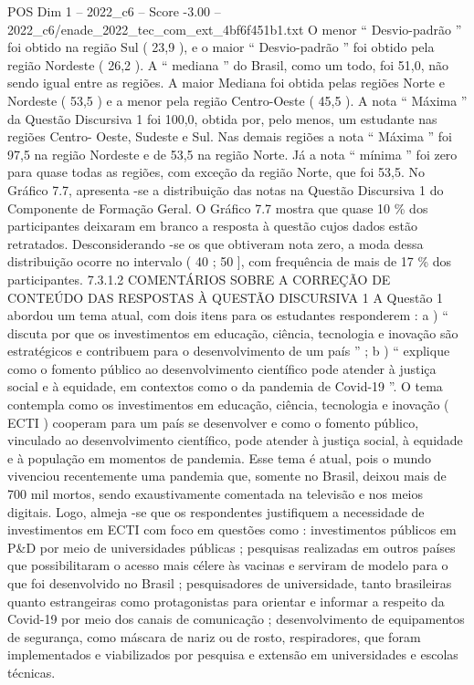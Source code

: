 \begin{textsample}{POS Dim 1 – 2022\_c6 – Score -3.00 – 2022\_c6/enade\_2022\_tec\_com\_ext\_4bf6f451b1.txt}
O menor “ Desvio-padrão ” foi obtido na região Sul ( 23,9 ), e o maior “ Desvio-padrão ” foi obtido pela região Nordeste ( 26,2 ).
A “ mediana ” do Brasil, como um todo, foi 51,0, não sendo igual entre as regiões.
A maior Mediana foi obtida pelas regiões Norte e Nordeste ( 53,5 ) e a menor pela região Centro-Oeste ( 45,5 ).
A nota “ Máxima ” da Questão Discursiva 1 foi 100,0, obtida por, pelo menos, um estudante nas regiões Centro- Oeste, Sudeste e Sul.
Nas demais regiões a nota “ Máxima ” foi 97,5 na região Nordeste e de 53,5 na região Norte.
Já a nota “ mínima ” foi zero para quase todas as regiões, com exceção da região Norte, que foi 53,5.
No Gráfico 7.7, apresenta -se a distribuição das notas na Questão Discursiva 1 do Componente de Formação Geral.
O Gráfico 7.7 mostra que quase 10 \% dos participantes deixaram em branco a resposta à questão cujos dados estão retratados.
Desconsiderando -se os que obtiveram nota zero, a moda dessa distribuição ocorre no intervalo ( 40 ; 50 ], com frequência de mais de 17 \% dos participantes. 7.3.1.2 COMENTÁRIOS SOBRE A CORREÇÃO DE CONTEÚDO DAS RESPOSTAS À QUESTÃO DISCURSIVA 1 A Questão 1 abordou um tema atual, com dois itens para os estudantes responderem : a ) “ discuta por que os investimentos em educação, ciência, tecnologia e inovação são estratégicos e contribuem para o desenvolvimento de um país ” ; b ) “ explique como o fomento público ao desenvolvimento científico pode atender à justiça social e à equidade, em contextos como o da pandemia de Covid-19 ”.
O tema contempla como os investimentos em educação, ciência, tecnologia e inovação ( ECTI ) cooperam para um país se desenvolver e como o fomento público, vinculado ao desenvolvimento científico, pode atender à justiça social, à equidade e à população em momentos de pandemia.
Esse tema é atual, pois o mundo vivenciou recentemente uma pandemia que, somente no Brasil, deixou mais de 700 mil mortos, sendo exaustivamente comentada na televisão e nos meios digitais.
Logo, almeja -se que os respondentes justifiquem a necessidade de investimentos em ECTI com foco em questões como : investimentos públicos em P\&D por meio de universidades públicas ; pesquisas realizadas em outros países que possibilitaram o acesso mais célere às vacinas e serviram de modelo para o que foi desenvolvido no Brasil ; pesquisadores de universidade, tanto brasileiras quanto estrangeiras como protagonistas para orientar e informar a respeito da Covid-19 por meio dos canais de comunicação ; desenvolvimento de equipamentos de segurança, como máscara de nariz ou de rosto, respiradores, que foram implementados e viabilizados por pesquisa e extensão em universidades e escolas técnicas.

\end{textsample}

